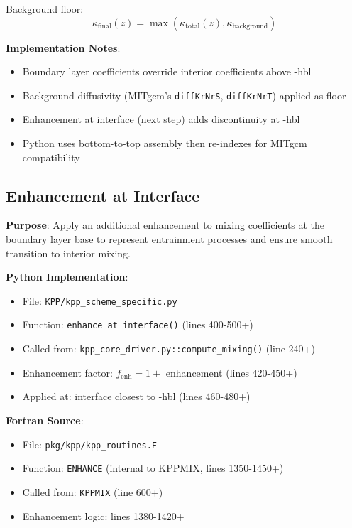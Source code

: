 \documentclass[11pt]{article}
\begin{document}
Background floor:
\begin{equation}
\kappa_{\text{final}}(z) = \max(\kappa_{\text{total}}(z), \kappa_{\text{background}})
\end{equation}

\textbf{Implementation Notes}:
\begin{itemize}
    \item Boundary layer coefficients override interior coefficients above -hbl
    \item Background diffusivity (MITgcm's \verb|diffKrNrS|, \verb|diffKrNrT|) applied as floor
    \item Enhancement at interface (next step) adds discontinuity at -hbl
    \item Python uses bottom-to-top assembly then re-indexes for MITgcm compatibility
\end{itemize}

\subsection{Enhancement at Interface}

\textbf{Purpose}: Apply an additional enhancement to mixing coefficients at the boundary layer base to represent entrainment processes and ensure smooth transition to interior mixing.

\textbf{Python Implementation}:
\begin{itemize}
    \item File: \verb|KPP/kpp_scheme_specific.py|
    \item Function: \verb|enhance_at_interface()| (lines 400-500+)
    \item Called from: \verb|kpp_core_driver.py::compute_mixing()| (line 240+)
    \item Enhancement factor: $f_{\text{enh}} = 1 + $ enhancement (lines 420-450+)
    \item Applied at: interface closest to -hbl (lines 460-480+)
\end{itemize}

\textbf{Fortran Source}:
\begin{itemize}
    \item File: \verb|pkg/kpp/kpp_routines.F|
    \item Function: \verb|ENHANCE| (internal to KPPMIX, lines 1350-1450+)
    \item Called from: \verb|KPPMIX| (line 600+)
    \item Enhancement logic: lines 1380-1420+
\end{itemize}
\end{document}
